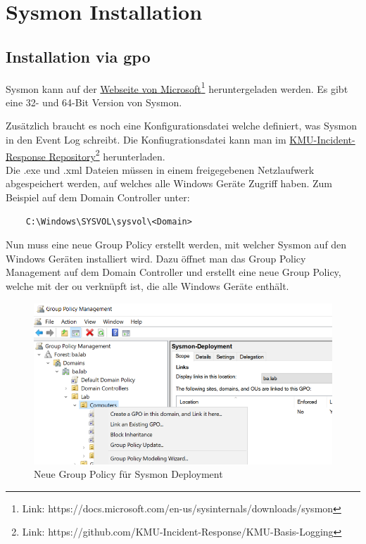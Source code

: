 \chapter{Sysmon Installation}

\section{Installation via \acrshort{gpo}}

Sysmon kann auf der \href{https://docs.microsoft.com/en-us/sysinternals/downloads/sysmon}{Webseite von Microsoft}\footnote{Link: https://docs.microsoft.com/en-us/sysinternals/downloads/sysmon} heruntergeladen werden.
Es gibt eine 32- und 64-Bit Version von Sysmon.

Zusätzlich braucht es noch eine Konfigurationsdatei welche definiert, was Sysmon in den Event Log schreibt.
Die Konfiugrationsdatei kann man im \href{https://github.com/KMU-Incident-Response/KMU-Basis-Logging}{KMU-Incident-Response Repository}\footnote{Link: https://github.com/KMU-Incident-Response/KMU-Basis-Logging} herunterladen.\\

Die .exe und .xml Dateien müssen in einem freigegebenen Netzlaufwerk abgespeichert werden, auf welches alle Windows Geräte Zugriff haben. Zum Beispiel auf dem Domain Controller unter:
\begin{lstlisting}
    C:\Windows\SYSVOL\sysvol\<Domain>
\end{lstlisting}

Nun muss eine neue Group Policy erstellt werden, mit welcher Sysmon auf den Windows Geräten installiert wird.
Dazu öffnet man das Group Policy Management auf dem Domain Controller und erstellt eine neue Group Policy, welche mit der \acrshort{ou} verknüpft ist, die alle Windows Geräte enthält.
\begin{figure}[H]
    \centering
    \includegraphics[width=\linewidth]{../img/agent/create-new-group-policy.png}
    \caption{Neue Group Policy für Sysmon Deployment}
\end{figure}

